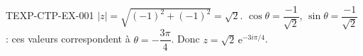 \begin{corrige}{TEXP-CTP-EX-001}
$|z| = \sqrt{(-1)^2+(-1)^2} = \sqrt2$. $\cos\theta=\dfrac{-1}{\sqrt2}$, $\sin\theta=\dfrac{-1}{\sqrt2}$ : ces valeurs correspondent à $\theta=-\dfrac{3\pi}{4}$. Donc $z=\sqrt2\,\mathrm{e}^{-3i\pi/4}$.
\end{corrige}
